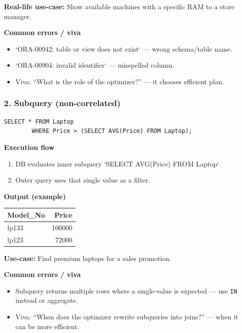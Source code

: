 \documentclass[11pt,a4paper]{article}
\begin{document}
	\textbf{Real-life use-case:} Show available machines with a specific RAM to a store manager.
	
	\textbf{Common errors / viva}
	\begin{itemize}[noitemsep]
		\item `ORA-00942: table or view does not exist` — wrong schema/table name.  
		\item `ORA-00904: invalid identifier` — misspelled column.
		\item Viva: ``What is the role of the optimizer?'' — it chooses efficient plan.
	\end{itemize}
	
	\bigskip
	\subsubsection*{2. Subquery (non-correlated)}
	\begin{lstlisting}[caption={Select laptops pricier than average laptop price}]
		SELECT * FROM Laptop
		WHERE Price > (SELECT AVG(Price) FROM Laptop);
	\end{lstlisting}
	
	\textbf{Execution flow}
	\begin{enumerate}[noitemsep]
		\item DB evaluates inner subquery `SELECT AVG(Price) FROM Laptop`.  
		\item Outer query uses that single value as a filter.  
	\end{enumerate}
	
	\textbf{Output (example)}
	\begin{center}
		\begin{tabular}{lr}
			\toprule
			Model\_No & Price \\
			\midrule
			lp133 & 100000 \\
			lp123 & 72000 \\
			\bottomrule
		\end{tabular}
	\end{center}
	
	\textbf{Use-case:} Find premium laptops for a sales promotion.
	
	\textbf{Common errors / viva}
	\begin{itemize}[noitemsep]
		\item Subquery returns multiple rows where a single-value is expected — use \texttt{IN} instead or aggregate.  
		\item Viva: ``When does the optimizer rewrite subqueries into joins?'' — when it can be more efficient.
	\end{itemize}
	
\end{document}
